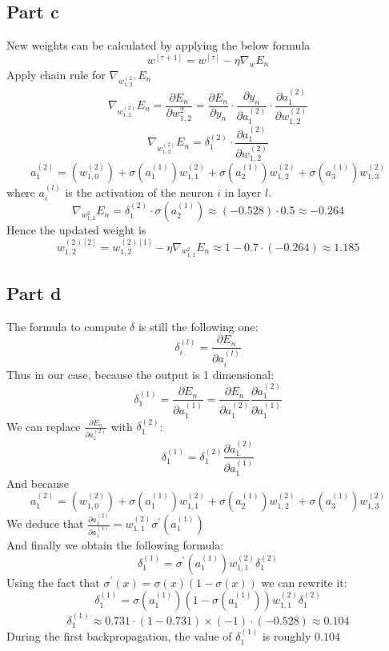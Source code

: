\documentclass[a4paper, 10pt]{article}
\begin{document}
\subsection{Part c}
New weights can be calculated by applying the below formula
$$
w^{[\tau +1]}=w^{[\tau]}-\eta\nabla_w E_n
$$
Apply chain rule for $\nabla_{w_{1,2}^{(2)}}E_n$
$$
\nabla_{w_{1,2}^{(2)}}E_n=\frac{\partial E_n}{\partial {w_{1,2}^{2}}}=\frac{\partial E_n}{\partial y_n}\cdot\frac{\partial y_n}{\partial a_1^{(2)}}\cdot\frac{\partial a_1^{(2)}}{\partial {w_{1,2}^{(2)}}}
$$
$$
\nabla_{w_{1,2}^{(2)}}E_n= \delta_1^{(2)} \cdot \frac{\partial a_1^{(2)}}{\partial w_{1,2}^{(2)}}
$$
$$
a_1^{(2)}=(w_{1,0}^{(2)})+\sigma(a_1^{(1)})w_{1,1}^{(2)}+\sigma(a_2^{(1)})w_{1,2}^{(2)}+\sigma(a_3^{(1)})w_{1,3}^{(2)}
$$
where $a_i^{(l)}$ is the activation of the neuron $i$ in layer $l$.
$$
\nabla_{w_{1,2}^{2}}E_n=\delta_1^{(2)}\cdot \sigma(a_2^{(1)}) \approx (-0.528)\cdot0.5\approx -0.264
$$
Hence the updated weight is
$$
w_{1,2}^{(2)[2]}=w_{1,2}^{(2)[1]} - \eta \nabla_{w_{1,2}^{2}}E_n \approx 1-0.7\cdot(-0.264) \approx 1.185
$$
\subsection{Part d}
The formula to compute $\delta$ is still the following one:
$$
\delta_i^{(l)} = \frac{\partial E_n}{\partial a_i^{(l)}}
$$
Thus in our case, because the output is 1 dimensional:
$$
\delta_1^{(1)} = \frac{\partial E_n}{\partial a_1^{(1)}} = \frac{\partial E_n}{\partial a_1^{(2)}}\frac{\partial a_1^{(2)}}{\partial a_1^{(1)}}
$$
We can replace $\frac{\partial E_n}{\partial a_1^{(2)}}$ with $\delta_1^{(2)}$:
$$
\delta_1^{(1)} = \delta_1^{(2)} \frac{\partial a_1^{(2)}}{\partial a_1^{(1)}}
$$
And because 
$$
a_1^{(2)}=(w_{1,0}^{(2)})+\sigma(a_1^{(1)})w_{1,1}^{(2)}+\sigma(a_2^{(1)})w_{1,2}^{(2)}+\sigma(a_3^{(1)})w_{1,3}^{(2)}
$$
We deduce that $\frac{\partial a_1^{(2)}}{\partial a_1^{(1)}} = w_{1,1}^{(2)}\sigma^\prime(a_1^{(1)})$
\\
And finally we obtain the following formula:
$$
\delta_1^{(1)} = \sigma^\prime(a_1^{(1)}) w_{1,1}^{(2)}\delta_1^{(2)} 
$$
Using the fact that $\sigma^\prime(x) = \sigma(x)(1-\sigma(x))$ we can rewrite it:
$$
\delta_1^{(1)} = \sigma(a_1^{(1)})(1-\sigma(a_1^{(1)}))w_{1,1}^{(2)}\delta_1^{(2)} 
$$
$$
\delta_1^{(1)} \approx 0.731\cdot(1-0.731)\times (-1)\cdot(-0.528) \approx 0.104
$$
During the first backpropagation, the value of $\delta_1^{(1)}$ is roughly $0.104$
\end{document}
